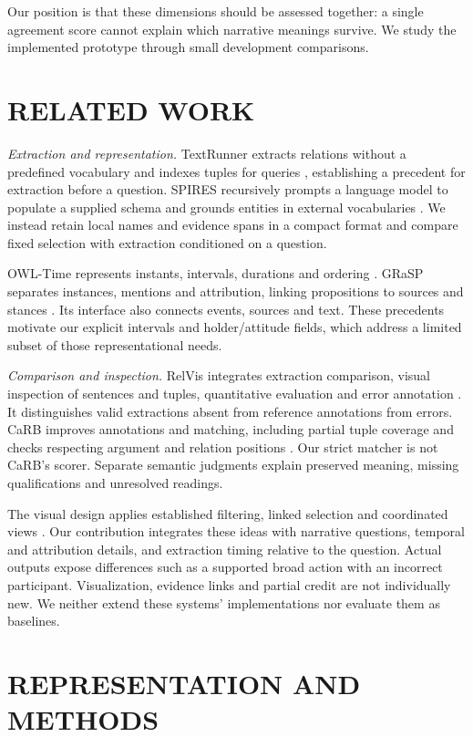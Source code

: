 \documentclass[a4paper,twoside]{article}
\begin{document}
Our position is that these dimensions should be assessed together: a single agreement score cannot explain which narrative meanings survive. We study the implemented prototype through small development comparisons.

\OrchardFigure
\section{\uppercase{Related Work}}
\noindent \emph{Extraction and representation.} TextRunner extracts relations without a predefined vocabulary and indexes tuples for queries \cite{banko2007}, establishing a precedent for extraction before a question. SPIRES recursively prompts a language model to populate a supplied schema and grounds entities in external vocabularies \cite{caufield2024}. We instead retain local names and evidence spans in a compact format and compare fixed selection with extraction conditioned on a question.

OWL-Time represents instants, intervals, durations and ordering \cite{time2017}. GRaSP separates instances, mentions and attribution, linking propositions to sources and stances \cite{fokkens2017}. Its interface also connects events, sources and text. These precedents motivate our explicit intervals and holder/attitude fields, which address a limited subset of those representational needs.

\emph{Comparison and inspection.} RelVis integrates extraction comparison, visual inspection of sentences and tuples, quantitative evaluation and error annotation \cite{schneider2017}. It distinguishes valid extractions absent from reference annotations from errors. CaRB improves annotations and matching, including partial tuple coverage and checks respecting argument and relation positions \cite{bhardwaj2019}. Our strict matcher is not CaRB's scorer. Separate semantic judgments explain preserved meaning, missing qualifications and unresolved readings.

The visual design applies established filtering, linked selection and coordinated views \cite{heer2012}. Our contribution integrates these ideas with narrative questions, temporal and attribution details, and extraction timing relative to the question. Actual outputs expose differences such as a supported broad action with an incorrect participant. Visualization, evidence links and partial credit are not individually new. We neither extend these systems' implementations nor evaluate them as baselines.

\section{\uppercase{Representation and Methods}}
\end{document}
